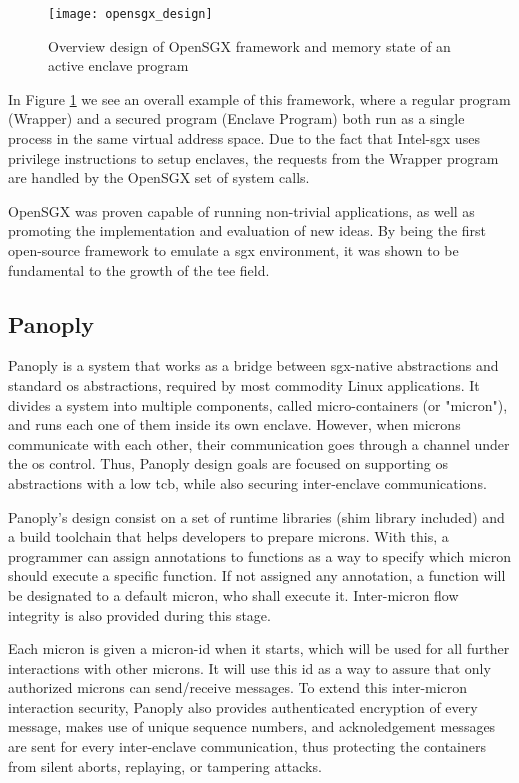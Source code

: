 \begin{figure}[htbp]
	\centering
	{\texttt{[image: opensgx\_design]}}
	\caption{Overview design of OpenSGX framework and memory state of an active enclave program}
	\label{fig:openSGXDesign}
\end{figure}

In Figure \ref{fig:openSGXDesign} we see an overall example of this framework, where a regular program (Wrapper) and a secured program (Enclave Program) both run as a single process in the same virtual address space. Due to the fact that Intel-\gls{sgx} uses privilege instructions to setup enclaves, the requests from the Wrapper program are handled by the OpenSGX set of system calls.

OpenSGX was proven capable of running non-trivial applications, as well as promoting the implementation and evaluation of new ideas. By being the first open-source framework to emulate a \gls{sgx} environment, it was shown to be fundamental to the growth of the \gls{tee} field.


\subsection{Panoply}
\label{ssec:panoply}

Panoply \cite{panoplyPaper} is a system that works as a bridge between \gls{sgx}-native abstractions and standard \gls{os} abstractions, required by most commodity Linux applications. 
It divides a system into multiple components, called micro-containers (or "micron"), and runs each one of them inside its own enclave. 
However, when microns communicate with each other, their communication goes through a channel under the \gls{os} control. Thus, Panoply design goals are focused on supporting \gls{os} abstractions with a low \gls{tcb}, while also securing inter-enclave communications.

Panoply's design consist on a set of runtime libraries (shim library included) and a build toolchain that helps developers to prepare microns.
With this, a programmer can assign annotations to functions as a way to specify which micron should execute a specific function. If not assigned any annotation, a function will be designated to a default micron, who shall execute it. Inter-micron flow integrity is also provided during this stage. 

Each micron is given a micron-id when it starts, which will be used for all further interactions with other microns. It will use this id as a way to assure that only authorized microns can send/receive messages.
To extend this inter-micron interaction security, Panoply also provides authenticated encryption of every message, makes use of unique sequence numbers, and acknoledgement messages are sent for every inter-enclave communication, thus protecting the containers from silent aborts, replaying, or tampering attacks.

